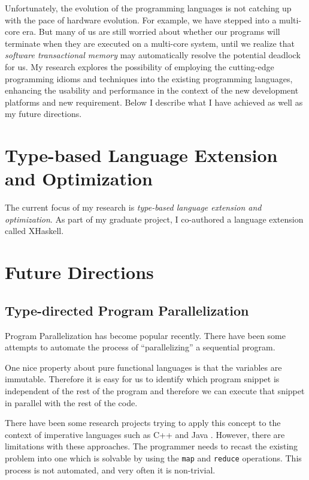 \documentclass[12pt]{article}
\theoremstyle{plain} \numberwithin{equation}{section}
\theoremstyle{definition}
\newcommand{\kl}[1]{}
\begin{document}
\kl{What is the problem?}
Unfortunately, the evolution of the programming languages 
is not catching up with the pace of hardware evolution.
For example, we have stepped into a multi-core era.
But many of us are still worried about whether our programs will terminate when they are executed on a multi-core system, until we realize
that {\em software transactional memory} \cite{stm} may automatically 
resolve the potential deadlock for us. 
My research explores the possibility of employing the cutting-edge
programming idioms and techniques into the existing 
programming languages, enhancing the usability and performance
in the context of the new development platforms and new requirement. 
Below I describe what I have achieved as well as my future directions.


\section{Type-based Language Extension and Optimization}

The current focus of my research is {\em type-based language 
extension and optimization}. As part of my 
graduate project, I co-authored a language extension called XHaskell.






\section{Future Directions}

\subsection{Type-directed Program Parallelization}
Program Parallelization has become popular recently. There have been 
some attempts to automate the process of ``parallelizing'' a
sequential program.

One nice property about pure functional languages is that
the variables are immutable. Therefore it is easy for us to identify
which program snippet is independent of the rest of the program
and therefore we can execute that snippet in parallel with the rest of
the code. 

There have been some research projects trying to apply this concept
to the context of imperative languages such as C++ \cite{mapreduce} 
and Java \cite{hadoop}. However, there are limitations with these
approaches. The programmer needs to recast the existing problem into 
one which is solvable by using the {\tt map} and {\tt reduce} operations.
This process is not automated, and very often it is non-trivial.
\end{document}
